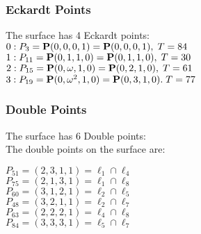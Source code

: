 \documentclass{article}
\newcommand{\bP}{{\bf P}}
\begin{document}
{\subsubsection*{Eckardt Points}
The surface has 4 Eckardt points:\\
$0 : P_{3}=\bP(0, 0, 0, 1) = \bP(0, 0, 0, 1),\; T= 84$\\
$1 : P_{11}=\bP(0, 1, 1, 0) = \bP(0, 1, 1, 0),\; T= 30$\\
$2 : P_{15}=\bP(0, \omega , 1, 0) = \bP(0, 2, 1, 0),\; T= 61$\\
$3 : P_{19}=\bP(0, \omega^{2}, 1, 0) = \bP(0, 3, 1, 0).\; T= 77$\\
\subsubsection*{Double Points}
The surface has 6 Double points:\\
The double points on the surface are:\\
\begin{multicols}{2}
\noindent
$P_{51} = ( 2, 3, 1, 1 ) = \ell_{1} \cap \ell_{4} $\\
$P_{75} = ( 2, 1, 3, 1 ) = \ell_{1} \cap \ell_{8} $\\
$P_{60} = ( 3, 1, 2, 1 ) = \ell_{2} \cap \ell_{5} $\\
$P_{48} = ( 3, 2, 1, 1 ) = \ell_{2} \cap \ell_{7} $\\
$P_{63} = ( 2, 2, 2, 1 ) = \ell_{4} \cap \ell_{8} $\\
$P_{84} = ( 3, 3, 3, 1 ) = \ell_{5} \cap \ell_{7} $\\
\end{multicols}
}
\end{document}
